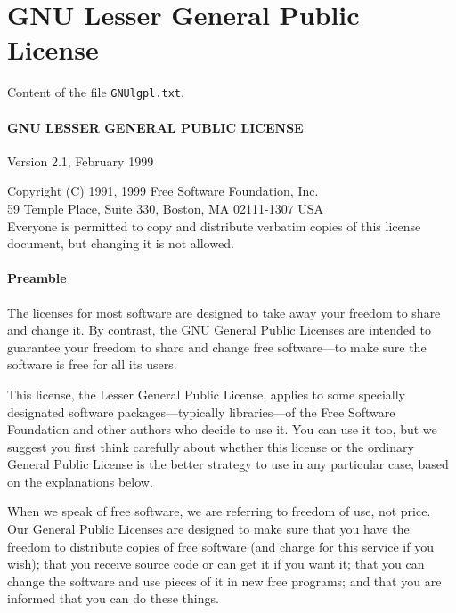 \chapter{GNU Lesser General Public License}
\label{chap:gnulgpl}

Content of the file {\tt GNUlgpl.txt}.

\subsubsection*{GNU LESSER GENERAL PUBLIC LICENSE}

Version 2.1, February 1999

\noindent Copyright (C) 1991, 1999 Free Software Foundation, Inc. \\
59 Temple Place, Suite 330, Boston, MA  02111-1307  USA \\
Everyone is permitted to copy and distribute verbatim copies of this
license document, but changing it is not allowed.


\subsubsection*{Preamble}

The licenses for most software are designed to take away your freedom
to share and change it.  By contrast, the GNU General Public Licenses
are intended to guarantee your freedom to share and change free
software---to make sure the software is free for all its users.

This license, the Lesser General Public License, applies to some
specially designated software packages---typically libraries---of the
Free Software Foundation and other authors who decide to use it.  You
can use it too, but we suggest you first think carefully about whether
this license or the ordinary General Public License is the better
strategy to use in any particular case, based on the explanations
below.

When we speak of free software, we are referring to freedom of use,
not price.  Our General Public Licenses are designed to make sure that
you have the freedom to distribute copies of free software (and charge
for this service if you wish); that you receive source code or can get
it if you want it; that you can change the software and use pieces of
it in new free programs; and that you are informed that you can do
these things.

